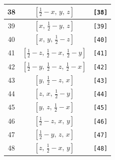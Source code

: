 \documentclass[fleqn,8pt]{jsarticle}
\begin{document}
\begin{longtable}{ccc}
38 & $\left[ \frac{1}{2} - x,\, y,\, z \right]$ & {\tt [38]} \\ \hline
39 & $\left[ x,\, \frac{1}{2} - y,\, z \right]$ & {\tt [39]} \\ \hline
40 & $\left[ x,\, y,\, \frac{1}{2} - z \right]$ & {\tt [40]} \\ \hline
41 & $\left[ \frac{1}{2} - z,\, \frac{1}{2} - x,\, \frac{1}{2} - y \right]$ & {\tt [41]} \\ \hline
42 & $\left[ \frac{1}{2} - y,\, \frac{1}{2} - z,\, \frac{1}{2} - x \right]$ & {\tt [42]} \\ \hline
43 & $\left[ y,\, \frac{1}{2} - z,\, x \right]$ & {\tt [43]} \\ \hline
44 & $\left[ z,\, x,\, \frac{1}{2} - y \right]$ & {\tt [44]} \\ \hline
45 & $\left[ y,\, z,\, \frac{1}{2} - x \right]$ & {\tt [45]} \\ \hline
46 & $\left[ \frac{1}{2} - z,\, x,\, y \right]$ & {\tt [46]} \\ \hline
47 & $\left[ \frac{1}{2} - y,\, z,\, x \right]$ & {\tt [47]} \\ \hline
48 & $\left[ z,\, \frac{1}{2} - x,\, y \right]$ & {\tt [48]} \\
\end{longtable}
\end{document}
